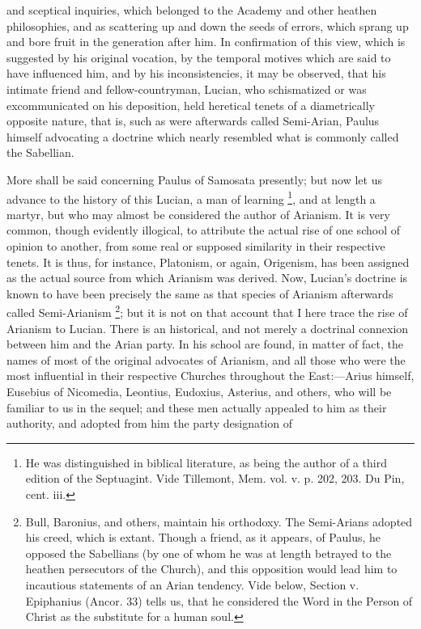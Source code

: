 and sceptical inquiries, which belonged to the Academy and other
heathen philosophies, and as scattering up and down the seeds of
errors, which sprang up and bore fruit in the generation after him. In
confirmation of this view, which is suggested by his original
vocation, by the temporal motives which are said to have influenced
him, and by his inconsistencies, it may be observed, that his intimate
friend and fellow-countryman, Lucian, who schismatized or was
excommunicated on his deposition, held heretical tenets of a
diametrically opposite nature, that is, such as were afterwards called
Semi-Arian, Paulus himself advocating a doctrine which nearly
resembled what is commonly called the Sabellian.

More shall be said concerning Paulus of Samosata presently; but now
let us advance to the history of this Lucian, a man of learning \footnote{He was distinguished in biblical
literature, as being the author of a third edition of the Septuagint.
Vide Tillemont, Mem. vol. v. p. 202, 203. Du Pin, cent. iii.}, and at length a martyr, but who may almost be considered the
author of Arianism. It is very common, though evidently illogical, to
attribute the actual rise of one school of opinion to another, from
some real or supposed similarity in their respective tenets. It is
thus, for instance, Platonism, or again, Origenism, has been assigned
as the actual source from which Arianism was derived. Now, Lucian's
doctrine is known to have been precisely the same as that species of
Arianism afterwards called Semi-Arianism \footnote{Bull, Baronius, and others, maintain his
orthodoxy. The Semi-Arians adopted his creed, which is extant. Though
a friend, as it appears, of Paulus, he opposed the Sabellians (by one
of whom he was at length betrayed to the heathen persecutors of the
Church), and this opposition would lead him to incautious statements
of an Arian tendency. Vide below, Section v. Epiphanius (Ancor. 33)
tells us, that he considered the Word in the Person of Christ as the
substitute for a human soul.}; but it is not on that account that I here trace the rise of
Arianism to Lucian. There is an historical, and not merely a doctrinal
connexion between him and the Arian party. In his school are found, in
matter of fact, the names of most of the original advocates of
Arianism, and all those who were the most influential in their
respective Churches throughout the East:—Arius himself, Eusebius of
Nicomedia, Leontius, Eudoxius, Asterius, and others, who will be
familiar to us in the sequel; and these men actually appealed to him
as their authority, and adopted from him the party designation of
